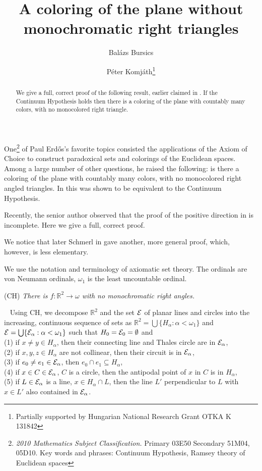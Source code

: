 \documentclass[12pt]{article}
\author{Bal\'azs Bursics \and P\'eter Komj\'ath\footnote{Partially supported by 
Hungarian National Research Grant OTKA K 131842}}
\title{A coloring of the plane without monochromatic right triangles}
\newcommand\subs\subseteq
\newcommand\emp\emptyset
\renewcommand\a{\alpha}
\renewcommand\o{\omega}
\newcommand\pf{\medskip\noindent{\bf Proof.}\ }
\newcommand\EE{{\cal E}}
\newcommand\RR{\mathbb{R}}
\begin{document}
  \maketitle

\begin{abstract} 
We give a full, correct proof of the following result, earlier claimed in 
\cite{kope1}.  
If the Continuum Hypothesis holds then there is a coloring of the plane 
with countably many colors, with no monocolored right triangle. 
\end{abstract}

\medskip 
One\footnote{{\sl 2010 Mathematics Subject Classification.} 
Primary 03E50  Secondary 51M04, 05D10. 
Key words and phrases: Continuum Hypothesis, Ramsey theory of Euclidean spaces} 
 of Paul Erd\H{o}s's favorite topics consisted the applications of the 
Axiom of Choice to construct paradoxical sets and colorings of the 
Euclidean spaces. 
Among a large number of other questions, he raised the following:  
is there a coloring of the plane with countably many colors, with 
no monocolored right angled triangles.  
In \cite{kope1} this was shown to be equivalent to the Continuum Hypothesis. 

Recently, the senior author observed that the proof of the positive 
direction in \cite{kope1} is incomplete. 
Here we give a full, correct proof.

We notice that later Schmerl in \cite{schmerl} gave another, more general 
proof, which, however, is less elementary.    


\medskip
{} 
We use the notation and terminology of axiomatic set theory. 
The ordinals are von Neumann ordinals, $\o_1$ is the least uncountable 
ordinal. 







\medskip
{} 
(CH) {\em There is $f:\RR^2\to\o$ with no monochromatic right angles.}

\pf 
Using CH, we decompose $\RR^2$ and the set $\EE$  of planar lines and circles 
into the increasing, continuous sequence of sets as 
$\RR^2=\bigcup\{H_\a:\a<\o_1\}$ and $\EE=\bigcup\{\EE_\a:\a<\o_1\}$ such 
that $H_0=\EE_0=\emp$ and \\
(1)  if $x\neq y\in H_\a$, then their connecting line and Thales circle 
are in $\EE_\a$, \\ 
(2) if $x,y,z\in H_\a$ are not collinear, then their circuit is in $\EE_\a$, \\
(3) if $e_0\neq e_1\in\EE_\a$, then $e_0\cap e_1\subs H_\a$, \\
(4) if $x\in C\in \EE_\a$, $C$ is a circle, then the antipodal point of $x$ 
in $C$ is in $H_\a$, \\ 
(5) if $L\in\EE_\a$ is a line, $x\in H_\a\cap L$, then the line $L'$ 
perpendicular to $L$ with $x\in L'$ also contained in $\EE_\a$. 
\end{document}

